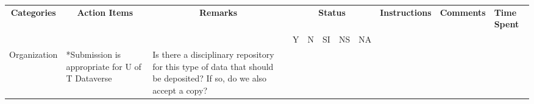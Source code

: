 \begin{table}[]
    \begin{tabular}{|l|l|l|lllll|l|l|l|}
    \hline
    \multicolumn{1}{|c|}{\multirow{2}{*}{\textbf{Categories}}} & \multicolumn{1}{c|}{\multirow{2}{*}{\textbf{Action Items}}}                                                                             & \multicolumn{1}{c|}{\multirow{2}{*}{\textbf{Remarks}}}                                                                                       & \multicolumn{5}{c|}{\textbf{Status}}                                                                                                                                                                                                                                                                                                                                                                              & \multicolumn{1}{c|}{\textbf{Instructions}}                                                 & \multicolumn{1}{c|}{\textbf{Comments}} & \textbf{Time Spent} \\ \cline{4-11} 
    \multicolumn{1}{|c|}{}                                     & \multicolumn{1}{c|}{}                                                                                                                   & \multicolumn{1}{c|}{}                                                                                                                        & \multicolumn{1}{l|}{Y}                                      & \multicolumn{1}{l|}{N}                                                                          & \multicolumn{1}{l|}{SI}                                                                          & \multicolumn{1}{l|}{NS}                                                          & NA                                                          &                                                                                            &                                        &                     \\ \hline
    \multirow{12}{*}{Organization}                             & *Submission is appropriate for U of T Dataverse                                                                                         & Is there a disciplinary repository for this type of data that should be deposited? If so, do we also accept a copy?                          & \multicolumn{1}{l|}{}                                       & \multicolumn{1}{l|}{}                                                                           & \multicolumn{1}{l|}{}                                                                            & \multicolumn{1}{l|}{}                                                            &                                                             &                                                                                            &                                        &                     \\ \cline{2-11} 

\end{tabular}
\end{table}
